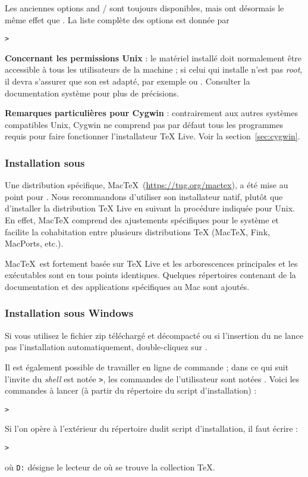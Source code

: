 \documentclass[german, english, french]{article}
\renewcommand{\TL}{\TeX{} Live\xspace}%
\begin{document}
Les anciennes options  and / sont
toujours disponibles, mais ont désormais le même effet que . La liste
complète des options est donnée par
\begin{alltt}
> 
\end{alltt}

\textbf{Concernant les permissions Unix} : le matériel installé doit normalement
être accessible à tous les utilisateurs de la machine ; si celui qui installe
n'est pas \textit{root}, il devra s'assurer que son  est adapté, par
exemple  ou .  Consulter la documentation
système pour plus de précisions.

\textbf{Remarques particulières pour Cygwin} : contrairement aux autres systèmes
compatibles Unix, Cygwin ne comprend pas par défaut tous les programmes requis
pour faire fonctionner l'installateur \TL. Voir la section~\ref{sec:cygwin}.

\subsubsection{Installation sous \MacOSX}
\label{sec:macosx}

Une distribution spécifique, Mac\TeX\ (\url{https://tug.org/mactex}), a été mise
au point pour \MacOSX.  Nous recommandons d'utiliser son installateur natif,
plutôt que d'installer la distribution \TL{} en suivant la procédure indiquée
pour Unix. En effet, Mac\TeX{} comprend des ajustements spécifiques pour le
système \MacOSX{} et facilite la cohabitation entre plusieurs distributions
\TeX{} (Mac\TeX, Fink, MacPorts, etc.).

Mac\TeX\ est fortement basée sur \TL et les arborescences principales et les
exécutables sont en tous points identiques. Quelques répertoires contenant de la
documentation et des applications spécifiques au Mac sont ajoutés.

\subsubsection{Installation sous Windows}\label{sec:wininst}

Si vous utilisez le fichier zip téléchargé et décompacté ou si l'insertion du
\DVD{} ne lance pas l'installation automatiquement, double-cliquez sur
.

Il est également possible de travailler en ligne de commande ; dans ce qui suit
l'invite du \textit{shell} est notée \texttt{>}, les commandes de l'utilisateur
sont notées . Voici les commandes à lancer (à partir du
répertoire du script d'installation) :
\begin{alltt}
> 
\end{alltt}
Si l'on opère à l'extérieur du répertoire dudit script d'installation, il faut
écrire :
\begin{alltt}
> 
\end{alltt}
où \texttt{D:} désigne le lecteur de \DVD où se trouve la collection \TeX.
\end{document}
